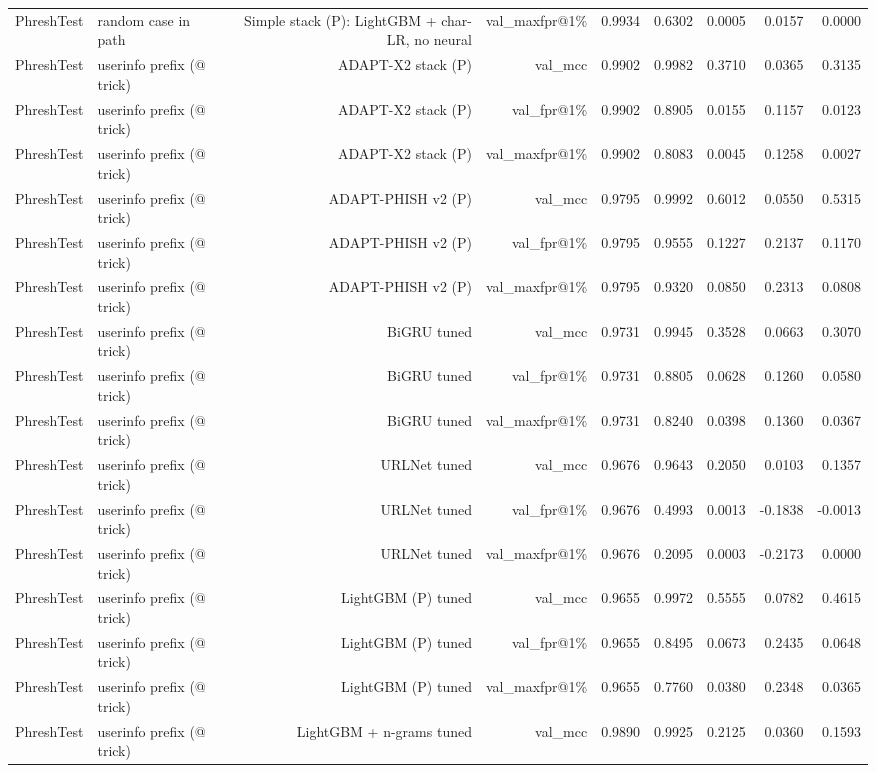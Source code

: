 \begin{table}[t]
\begin{tabular}{llrrrrrrr}
PhreshTest & random case in path & Simple stack (P): LightGBM + char-LR, no neural & val\_maxfpr@1\% & 0.9934 & 0.6302 & 0.0005 & 0.0157 & 0.0000 \\
PhreshTest & userinfo prefix (@ trick) & ADAPT-X2 stack (P) & val\_mcc & 0.9902 & 0.9982 & 0.3710 & 0.0365 & 0.3135 \\
PhreshTest & userinfo prefix (@ trick) & ADAPT-X2 stack (P) & val\_fpr@1\% & 0.9902 & 0.8905 & 0.0155 & 0.1157 & 0.0123 \\
PhreshTest & userinfo prefix (@ trick) & ADAPT-X2 stack (P) & val\_maxfpr@1\% & 0.9902 & 0.8083 & 0.0045 & 0.1258 & 0.0027 \\
PhreshTest & userinfo prefix (@ trick) & ADAPT-PHISH v2 (P) & val\_mcc & 0.9795 & 0.9992 & 0.6012 & 0.0550 & 0.5315 \\
PhreshTest & userinfo prefix (@ trick) & ADAPT-PHISH v2 (P) & val\_fpr@1\% & 0.9795 & 0.9555 & 0.1227 & 0.2137 & 0.1170 \\
PhreshTest & userinfo prefix (@ trick) & ADAPT-PHISH v2 (P) & val\_maxfpr@1\% & 0.9795 & 0.9320 & 0.0850 & 0.2313 & 0.0808 \\
PhreshTest & userinfo prefix (@ trick) & BiGRU tuned & val\_mcc & 0.9731 & 0.9945 & 0.3528 & 0.0663 & 0.3070 \\
PhreshTest & userinfo prefix (@ trick) & BiGRU tuned & val\_fpr@1\% & 0.9731 & 0.8805 & 0.0628 & 0.1260 & 0.0580 \\
PhreshTest & userinfo prefix (@ trick) & BiGRU tuned & val\_maxfpr@1\% & 0.9731 & 0.8240 & 0.0398 & 0.1360 & 0.0367 \\
PhreshTest & userinfo prefix (@ trick) & URLNet tuned & val\_mcc & 0.9676 & 0.9643 & 0.2050 & 0.0103 & 0.1357 \\
PhreshTest & userinfo prefix (@ trick) & URLNet tuned & val\_fpr@1\% & 0.9676 & 0.4993 & 0.0013 & -0.1838 & -0.0013 \\
PhreshTest & userinfo prefix (@ trick) & URLNet tuned & val\_maxfpr@1\% & 0.9676 & 0.2095 & 0.0003 & -0.2173 & 0.0000 \\
PhreshTest & userinfo prefix (@ trick) & LightGBM (P) tuned & val\_mcc & 0.9655 & 0.9972 & 0.5555 & 0.0782 & 0.4615 \\
PhreshTest & userinfo prefix (@ trick) & LightGBM (P) tuned & val\_fpr@1\% & 0.9655 & 0.8495 & 0.0673 & 0.2435 & 0.0648 \\
PhreshTest & userinfo prefix (@ trick) & LightGBM (P) tuned & val\_maxfpr@1\% & 0.9655 & 0.7760 & 0.0380 & 0.2348 & 0.0365 \\
PhreshTest & userinfo prefix (@ trick) & LightGBM + n-grams tuned & val\_mcc & 0.9890 & 0.9925 & 0.2125 & 0.0360 & 0.1593 \\

\end{tabular}
\end{table}
